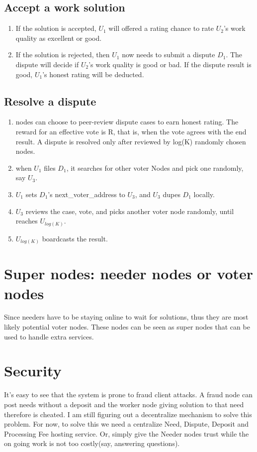 \documentclass[12pt]{article}
\begin{document}
\subsection{Accept a work solution}
\begin{enumerate}
	\item If the solution is accepted, $U_1$ will offered a rating chance to rate $U_2$'s work quality as excellent or good.
	\item If the solution is rejected, then $U_1$ now needs to submit a dispute $D_1$. The dispute will decide if $U_2$'s work quality is good or bad. If the dispute result is good, $U_1$'s honest rating will be deducted. 
\end{enumerate}

\subsection{Resolve a dispute}
\begin{enumerate}
	\item nodes can choose to peer-review dispute cases to earn honest rating. The reward for an effective vote is R, that is, when the vote agrees with the end result. A dispute is resolved only after reviewed by log(K) randomly chosen nodes.
	\item when $U_1$ files $D_1$, it searches for other voter Nodes and pick one randomly, say $U_3$. 
	\item $U_1$ sets $D_1$'s next\_voter\_address to $U_3$, and $U_3$ dupes $D_1$ locally. 
	\item $U_3$ reviews the case, vote, and picks another voter node randomly, until reaches $U_{log(K)}$.
	\item $U_{log(K)}$ boardcasts the result.
\end{enumerate}

\section{Super nodes: needer nodes or voter nodes}
Since needers have to be staying online to wait for solutions, thus they are most likely potential voter nodes. These nodes can be seen as super nodes that can be used to handle extra services.

\section{Security}
It's easy to see that the system is prone to fraud client attacks. A fraud node can post needs without a deposit and the worker node giving solution to that need therefore is cheated. I am still figuring out a decentralize mechanism to solve this problem. For now, to solve this we need a centralize Need, Dispute, Deposit and Processing Fee hosting service. Or, simply give the Needer nodes trust while the on going work is not too costly(say, answering questions).
\end{document}

